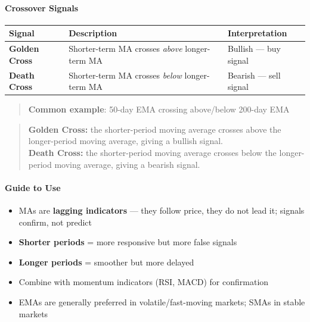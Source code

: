 \documentclass[12pt,openany]{book}
\begin{document}
\paragraph{Crossover Signals}

\begin{center}
\small
\renewcommand{\arraystretch}{1.2}
\begin{tabular}{|L{0.25\textwidth}|L{0.34\textwidth}|L{0.31\textwidth}|}
\hline
 \textbf{Signal} & \textbf{Description} & \textbf{Interpretation} \\ \hline
 \textbf{Golden Cross} & Shorter-term MA crosses \emph{above} longer-term MA & Bullish --- buy signal \\ \hline
 \textbf{Death Cross} & Shorter-term MA crosses \emph{below} longer-term MA & Bearish --- sell signal \\ \hline
\end{tabular}
\end{center}

\begin{quote}
\textbf{Common example}: 50-day EMA crossing above/below 200-day EMA

\end{quote}
\begin{quote}
\textbf{Golden Cross:} the shorter-period moving average crosses above the longer-period moving average, giving a bullish signal.\\
\textbf{Death Cross:} the shorter-period moving average crosses below the longer-period moving average, giving a bearish signal.
\end{quote}

\paragraph{Guide to Use}
\begin{itemize}[leftmargin=*]
    \item MAs are \textbf{lagging indicators} --- they follow price, they do not lead it; signals confirm, not predict
    \item \textbf{Shorter periods} = more responsive but more false signals
    \item \textbf{Longer periods} = smoother but more delayed
    \item Combine with momentum indicators (RSI, MACD) for confirmation
    \item EMAs are generally preferred in volatile/fast-moving markets; SMAs in stable markets
\end{itemize}
\end{document}
